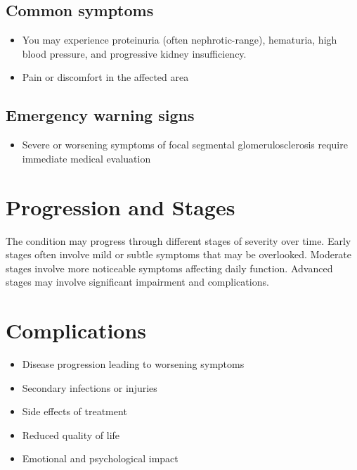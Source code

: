 \subsection{Common symptoms}
\begin{itemize}[noitemsep]
  \item You may experience proteinuria (often nephrotic-range), hematuria, high blood pressure, and progressive kidney insufficiency.
  \item Pain or discomfort in the affected area
  \end{itemize}
\subsection{Emergency warning signs}
\begin{itemize}[noitemsep]
  \item Severe or worsening symptoms of focal segmental glomerulosclerosis require immediate medical evaluation
\end{itemize}
\section{Progression and Stages}
The condition may progress through different stages of severity over time. Early stages often involve mild or subtle symptoms that may be overlooked. Moderate stages involve more noticeable symptoms affecting daily function. Advanced stages may involve significant impairment and complications.
\section{Complications}
\begin{itemize}[noitemsep]
  \item Disease progression leading to worsening symptoms
  \item Secondary infections or injuries
  \item Side effects of treatment
  \item Reduced quality of life
  \item Emotional and psychological impact
\end{itemize}
